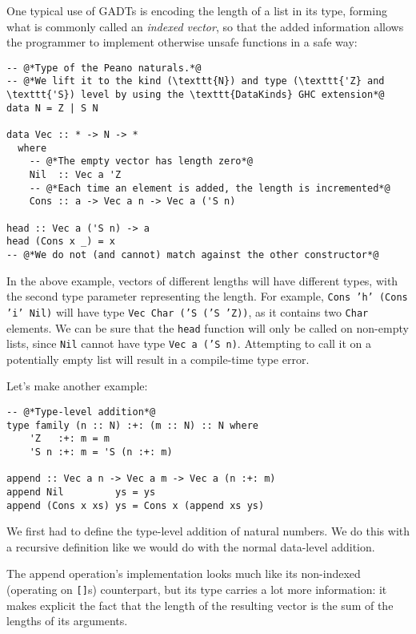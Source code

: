 One typical use of GADTs is encoding the length of a list in its type, forming what is commonly called an \emph{indexed vector}, so that the added information allows the programmer to implement otherwise unsafe functions in a safe way:

\begin{lstlisting}[caption=A length-indexed vector]
-- @*Type of the Peano naturals.*@
-- @*We lift it to the kind (\texttt{N}) and type (\texttt{'Z} and \texttt{'S}) level by using the \texttt{DataKinds} GHC extension*@
data N = Z | S N

data Vec :: * -> N -> *
  where
    -- @*The empty vector has length zero*@
    Nil  :: Vec a 'Z
    -- @*Each time an element is added, the length is incremented*@
    Cons :: a -> Vec a n -> Vec a ('S n)

head :: Vec a ('S n) -> a
head (Cons x _) = x
-- @*We do not (and cannot) match against the other constructor*@
\end{lstlisting}

In the above example, vectors of different lengths will have different types, with the second type parameter representing the length.
For example, \texttt{Cons 'h' (Cons 'i' Nil)} will have type \texttt{Vec Char ('S ('S 'Z))}, as it contains two \texttt{Char} elements.
We can be sure that the \texttt{head} function will only be called on non-empty lists, since \texttt{Nil} cannot have type \texttt{Vec a ('S n)}.
Attempting to call it on a potentially empty list will result in a compile-time type error.

Let's make another example:

\begin{lstlisting}[caption=Appending a \texttt{Vec} to another]
-- @*Type-level addition*@
type family (n :: N) :+: (m :: N) :: N where
    'Z   :+: m = m
    'S n :+: m = 'S (n :+: m)

append :: Vec a n -> Vec a m -> Vec a (n :+: m)
append Nil         ys = ys
append (Cons x xs) ys = Cons x (append xs ys)
\end{lstlisting}

We first had to define the type-level addition of natural numbers. We do this with a recursive definition like we would do with the normal data-level addition.

The append operation's implementation looks much like its non-indexed (operating on \texttt{[]}s) counterpart, but its type carries a lot more information: it makes explicit the fact that the length of the resulting vector is the sum of the lengths of its arguments.

